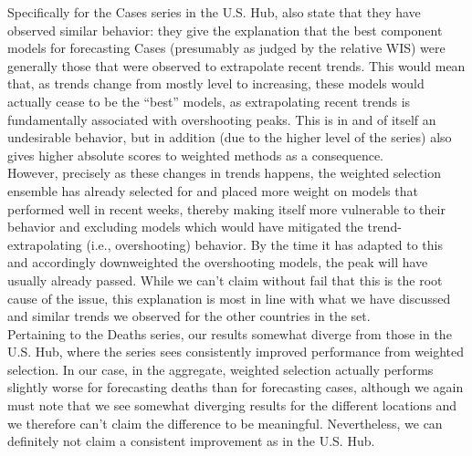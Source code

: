 Specifically for the Cases series in the U.S. Hub, \cite{ray_comparing_2022} also state that they have observed similar behavior: they give the explanation that the best component models for forecasting Cases (presumably as judged by the relative WIS) were generally those that were observed to extrapolate recent trends. This would mean that, as trends change from mostly level to increasing, these models would actually cease to be the ``best'' models, as extrapolating recent trends is fundamentally associated with overshooting peaks. This is in and of itself an undesirable behavior, but in addition (due to the higher level of the series) also gives higher absolute scores to weighted methods as a consequence.\\
However, precisely as these changes in trends happens, the weighted selection ensemble has already selected for and placed more weight on models that performed well in recent weeks, thereby making itself more vulnerable to their behavior and excluding models which would have mitigated the trend-extrapolating (i.e., overshooting) behavior. By the time it has adapted to this and accordingly downweighted the overshooting models, the peak will have usually already passed. While we can't claim without fail that this is the root cause of the issue, this explanation is most in line with what we have discussed and similar trends we observed for the other countries in the set.\medskip\\
Pertaining to the Deaths series, our results somewhat diverge from those in the U.S. Hub, where the series sees consistently improved performance from weighted selection. In our case, in the aggregate, weighted selection actually performs slightly worse for forecasting deaths than for forecasting cases, although we again must note that we see somewhat diverging results for the different locations and we therefore can't claim the difference to be meaningful. Nevertheless, we can definitely not claim a consistent improvement as in the U.S. Hub.\\
